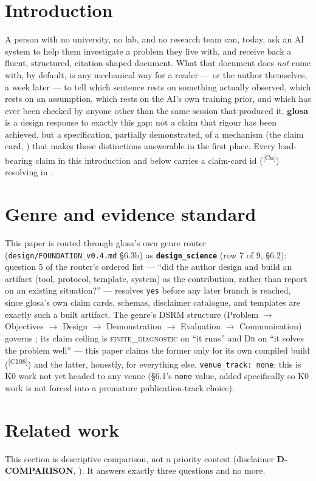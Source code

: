 \documentclass[11pt]{article}
\newcommand{\FiniteDiag}{\textsc{finite\_diagnostic}}
\newcommand{\DrTier}{\textsc{Dr}}
\newcommand{\claimref}[1]{\textsuperscript{[#1]}}
\begin{document}
\section{Introduction}
\label{sec:intro}
A person with no university, no lab, and no research team can, today, ask an AI system to help
them investigate a problem they live with, and receive back a fluent, structured, citation-shaped
document. What that document does \emph{not} come with, by default, is any mechanical way for a
reader --- or the author themselves, a week later --- to tell which sentence rests on something
actually observed, which rests on an assumption, which rests on the AI's own training prior, and
which has ever been checked by anyone other than the same session that produced it. \textbf{glosa}
is a design response to exactly this gap: not a claim that rigour has been achieved, but a
specification, partially demonstrated, of a mechanism (the claim card, ) that
makes those distinctions answerable in the first place. Every load-bearing claim in this
introduction and below carries a claim-card id (\claimref{Cn}) resolving in
.

\section{Genre and evidence standard}
\label{sec:genre}
This paper is routed through glosa's own genre router (\texttt{design/FOUNDATION\_v0.4.md}
\S6.3b) as \textbf{\texttt{design\_science}} (row 7 of 9, \S6.2): question 5 of the router's
ordered list --- ``did the author design and build an artifact (tool, protocol, template, system)
as the contribution, rather than report on an existing situation?'' --- resolves \texttt{yes}
before any later branch is reached, since glosa's own claim cards, schemas, disclaimer catalogue,
and templates are exactly such a built artifact. The genre's DSRM structure (Problem $\to$
Objectives $\to$ Design $\to$ Demonstration $\to$ Evaluation $\to$ Communication) governs
; its claim ceiling is
\FiniteDiag{} on ``it runs'' and \DrTier{} on ``it solves the problem well'' --- this paper claims
the former only for its own compiled build (\claimref{C108}) and the latter, honestly, for
everything else. \texttt{venue\_track: none}: this is K0 work not yet headed to any venue
(\S6.1's \texttt{none} value, added specifically so K0 work is not forced into a premature
publication-track choice).

\section{Related work}
\label{sec:related}
This section is descriptive comparison, not a priority contest (disclaimer
\textbf{D-COMPARISON}, ). It answers exactly three
questions and no more.
\end{document}
